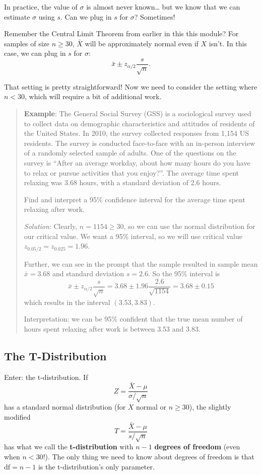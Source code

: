 \documentclass[
]{book}
\begin{document}
In practice, the value of \(\sigma\) is almost never known\ldots{} but we know that we can estimate \(\sigma\) using \(s\). Can we plug in \(s\) for \(\sigma\)? Sometimes!

Remember the Central Limit Theorem from earlier in this this module? For samples of size \(n \ge 30\), \(\bar{X}\) will be approximately normal even if \(X\) isn't. In this case, we can plug in \(s\) for \(\sigma\): \[\bar{x} \pm z_{\alpha/2}\frac{s}{\sqrt{n}}.\]

That setting is pretty straightforward! Now we need to consider the setting where \(n < 30\), which will require a bit of additional work.

\begin{quote}
\textbf{Example}: The General Social Survey (GSS) is a sociological survey used to collect data on demographic characteristics and attitudes of residents of the United States. In 2010, the survey collected responses from 1,154 US residents. The survey is conducted face-to-face with an in-person interview of a randomly selected sample of adults. One of the questions on the survey is ``After an average workday, about how many hours do you have to relax or pursue activities that you enjoy?''. The average time spent relaxing was 3.68 hours, with a standard deviation of 2.6 hours.

Find and interpret a 95\% confidence interval for the average time spent relaxing after work.

\emph{Solution}: Clearly, \(n = 1154 \ge 30\), so we can use the normal distribution for our critical value. We want a 95\% interval, so we will use critical value \(z_{0.05/2} = z_{0.025} = 1.96\).

Further, we can see in the prompt that the sample resulted in sample mean \(\bar{x} = 3.68\) and standard deviation \(s = 2.6\). So the 95\% interval is
\[ \bar{x} \pm z_{\alpha/2}\frac{s}{\sqrt{n}} = 3.68 \pm 1.96 \frac{2.6}{\sqrt{1154}} = 3.68 \pm 0.15\]
which results in the interval \((3.53, 3.83)\).

Interpretation: we can be 95\% confident that the true mean number of hours spent relaxing after work is between 3.53 and 3.83.
\end{quote}

\subsection{The T-Distribution}\label{the-t-distribution}

Enter: the t-distribution. If \[Z = \frac{\bar{X}-\mu}{\sigma/\sqrt{n}}\] has a standard normal distribution (for \(X\) normal or \(n\ge30\)), the slightly modified \[T = \frac{\bar{X}-\mu}{s/\sqrt{n}}\] has what we call the \textbf{t-distribution} with \(n-1\) \textbf{degrees of freedom} (even when \(n < 30\)!). The only thing we need to know about degrees of freedom is that \(\text{df}=n-1\) is the t-distribution's only parameter.
\end{document}
